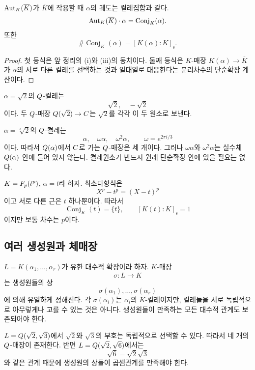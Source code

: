 \begin{corollary}
$\operatorname{Aut}_K(\overline K)$가 $\overline K$에 작용할 때 $\alpha$의 궤도는 켤레집합과 같다.
\[
  \operatorname{Aut}_K(\overline K)\cdot\alpha
  =\operatorname{Conj}_K(\alpha).
\]
또한
\[
  \#\operatorname{Conj}_K(\alpha)
  =[K(\alpha):K]_{\mathrm s}.
\]
\end{corollary}

\begin{proof}
첫 등식은 앞 정리의 (i)와 (iii)의 동치이다. 둘째 등식은 $K$-매장 $K(\alpha)\to\overline K$가 $\alpha$의 서로 다른 켤레를 선택하는 것과 일대일로 대응한다는 분리차수의 단순확장 계산이다.
\end{proof}

\begin{example}
$\alpha=\sqrt2$의 $Q$-켤레는
\[
  \sqrt2,\quad -\sqrt2
\]
이다. 두 $Q$-매장 $Q(\sqrt2)\to C$는 $\sqrt2$를 각각 이 두 원소로 보낸다.
\end{example}

\begin{example}
$\alpha=\sqrt[3]{2}$의 $Q$-켤레는
\[
  \alpha,\quad \omega\alpha,\quad \omega^2\alpha,
  \qquad \omega=e^{2\pi i/3}
\]
이다. 따라서 $Q(\alpha)$에서 $C$로 가는 $Q$-매장은 세 개이다. 그러나 $\omega\alpha$와 $\omega^2\alpha$는 실수체 $Q(\alpha)$ 안에 들어 있지 않는다. 켤레원소가 반드시 원래 단순확장 안에 있을 필요는 없다.
\end{example}

\begin{example}[순수비분리 원소]
$K=F_p(t^p)$, $\alpha=t$라 하자. 최소다항식은
\[
  X^p-t^p=(X-t)^p
\]
이고 서로 다른 근은 $t$ 하나뿐이다. 따라서
\[
  \operatorname{Conj}_K(t)=\{t\},
  \qquad
  [K(t):K]_{\mathrm s}=1
\]
이지만 보통 차수는 $p$이다.
\end{example}

\subsection{여러 생성원과 체매장}

$L=K(\alpha_1,\dots,\alpha_r)$가 유한 대수적 확장이라 하자. $K$-매장
\[
  \sigma:L\longrightarrow\overline K
\]
는 생성원들의 상
\[
  \sigma(\alpha_1),\dots,\sigma(\alpha_r)
\]
에 의해 유일하게 정해진다. 각 $\sigma(\alpha_i)$는 $\alpha_i$의 $K$-켤레이지만, 켤레들을 서로 독립적으로 아무렇게나 고를 수 있는 것은 아니다. 생성원들이 만족하는 모든 대수적 관계도 보존되어야 한다.

\begin{example}
$L=Q(\sqrt2,\sqrt3)$에서 $\sqrt2$와 $\sqrt3$의 부호는 독립적으로 선택할 수 있다. 따라서 네 개의 $Q$-매장이 존재한다. 반면 $L=Q(\sqrt2,\sqrt6)$에서는
\[
  \sqrt6=\sqrt2\sqrt3
\]
와 같은 관계 때문에 생성원의 상들이 곱셈관계를 만족해야 한다.
\end{example}

